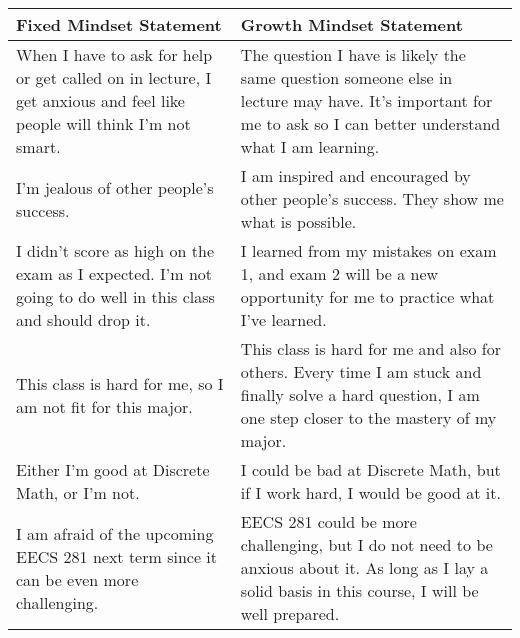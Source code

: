 \documentclass[12pt]{exam}
\begin{document}
\begin{solution}
    \begin{center}
        \begin{tabular}{ |p{18em}|p{18em}| } 
        \hline
        \textbf{Fixed Mindset Statement} & \textbf{Growth Mindset Statement}\\
        \hline
        
        When I have to ask for help or get called on in lecture, I get anxious and feel like people will think I’m not smart.
        
        & The question I have is likely the same question someone else in lecture may have. It's important for me to ask so I can better understand what I am learning.
        \\ \hline
        
        I'm jealous of other people's success.
        
        & I am inspired and encouraged by other people's success. They show me what is possible.
        
        \\ \hline
        
        I didn't score as high on the exam as I expected. I'm not going to do well in this class and should drop it.
        
        & I learned from my mistakes on exam 1, and exam 2 will be a new opportunity for me to practice what I've learned.
        
        \\ \hline
        
        This class is hard for me, so I am not fit for this major.
        & This class is hard for me and also for others. Every time I am stuck and finally solve a hard question, I am one step closer to the mastery of my major.
        \\ \hline
        
        Either I'm good at Discrete Math, or I'm not. 
        & I could be bad at Discrete Math, but if I work hard, I would be good at it.
        \\ \hline
        
        I am afraid of the upcoming EECS 281 next term since it can be even more challenging.
        & EECS 281 could be more challenging, but I do not need to be anxious about it. As long as I lay a solid basis in this course, I will be well prepared.\\ 
        \hline
        \end{tabular}
        \end{center}
        
\end{solution}
\end{document}
